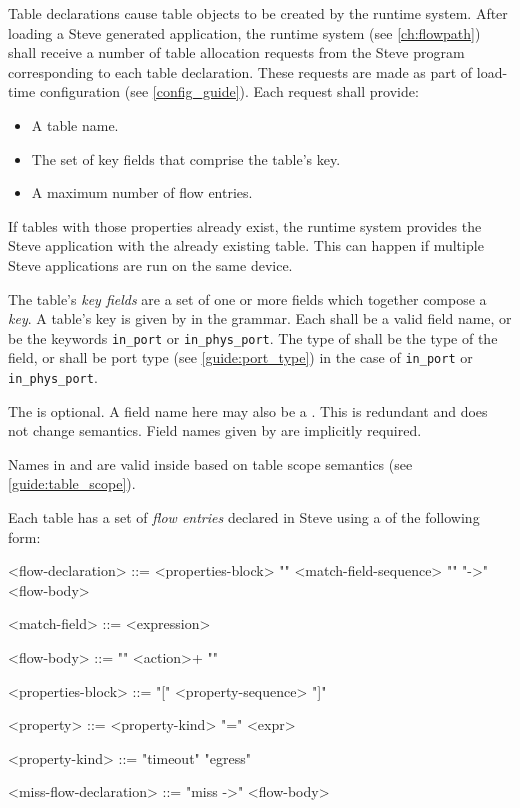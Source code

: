 Table declarations cause table objects to be created by the runtime system. After loading a Steve generated application, the runtime system (see \ref{ch:flowpath}) shall receive a number of table allocation requests from the Steve program corresponding to each table declaration. These requests are made as part of load-time configuration (see \ref{config_guide}). Each request shall provide:

\begin{itemize}
\item A table name.
\item The set of key fields that comprise the table's key.
\item A maximum number of flow entries.
\end{itemize}

If tables with those properties already exist, the runtime system provides the Steve application with the already existing table. This can happen if multiple Steve applications are run on the same device.

The table's \textit{key fields} are a set of one or more fields which together compose a \textit{key}. A table's key is given by  in the grammar. Each  shall be a valid field name, or be the keywords \texttt{in\_port} or \texttt{in\_phys\_port}. The type of  shall be the type of the field, or shall be port type (see \ref{guide:port_type}) in the case of \texttt{in\_port} or \texttt{in\_phys\_port}.

The  is optional. A field name here may also be a . This is redundant and does not change semantics. Field names given by  are implicitly required.

Names in  and  are valid inside  based on table scope semantics (see \ref{guide:table_scope}).

Each table has a set of \textit{flow entries} declared in Steve using a  of the following form:

\begin{minip}
\begin{grammar}
<flow-declaration> ::=
<properties-block>
"{" <match-field-sequence> "}" "->" <flow-body>

<match-field> ::= <expression>

<flow-body> ::= "{" <action>+ "}"

<properties-block> ::=
"[" <property-sequence> "]"

<property> ::=
<property-kind> "=" <expr>

<property-kind> ::=
"timeout"
\alt "egress"

<miss-flow-declaration> ::=
"miss ->" <flow-body>
\end{grammar}
\end{minip}

